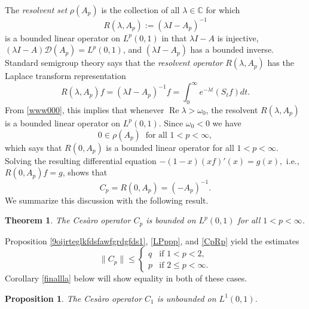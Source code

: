 \documentclass[11pt]{amsart}
\numberwithin{equation}{section}
\theoremstyle{plain}
\newtheorem{Proposition}[equation]{Proposition}
\newtheorem{Theorem}[equation]{Theorem}
\theoremstyle{definition}
\renewcommand{\leq}{\leqslant}
\renewcommand{\Re}[1]{\operatorname{Re} #1 }
\newcommand{\0}{{\color{lightgray}0}}
\begin{document}
 The {\em resolvent set} $\rho(A_p)$ is the collection of all $\lambda\in\mathbb{C}$ for which 
$$R(\lambda,A_p):=(\lambda I-A_p)^{-1}$$
is a bounded linear operator on $L^p(0, 1)$ in that $\lambda I - A$ is injective, $(\lambda I - A) \mathcal{D}(A_p) = L^p(0, 1)$, and $(\lambda I - A_p)$ has a bounded inverse. 
Standard semigroup theory  says that the {\em resolvent operator} $R(\lambda,A_p)$ has the Laplace transform  representation
\begin{equation}\label{LPppp}
R(\lambda,A_p)f =(\lambda I-A_p)^{-1}f =\int_{0}^{\infty}e^{-\lambda t}(S_{t}f)dt.
\end{equation}
From \eqref{www000}, this implies that whenever $\Re \lambda >\omega_{0}$, the resolvent $R(\lambda,A_p)$ is a bounded linear operator on $L^{p}(0,1)$. Since $\omega_{0}<0$ we have 
$$0\in\rho(A_p) \; \; \mbox{for all $1<p<\infty$},$$ which says that $R(0,A_p)$ is a bounded linear operator for all $1<p<\infty$.   Solving the resulting differential equation 
$-(1 - x) (x f)'(x) = g(x),$
i.e., $R(0, A_p) f = g$,  shows that 
\begin{equation}\label{CpRp}
C_p = R(0, A_p) = (-A_{p})^{-1}.
\end{equation} We summarize this discussion with the following result. 


\begin{Theorem}\label{BDLp}
The Ces\`{a}ro operator  $C_p$
is bounded on $L^{p}(0, 1)$ for all $1<p<\infty$.
\end{Theorem}

Proposition \ref{9oijrteglkfdsfawfgrdgfds1}, \eqref{LPppp}, and  \eqref{CpRp} yield the estimates 
\begin{equation}\label{upperCp}
\|C_p\| \leq 
\begin{cases}
q & \mbox{if $1 < p < 2$},\\
p & \mbox{if $2 \leq p < \infty$.}
\end{cases}
\end{equation}
Corollary \ref{finallla} below will show equality in both of these cases. 



\begin{Proposition}
The Ces\`{a}ro operator $C_1$  is unbounded on $L^1(0, 1)$.
\end{Proposition}
\end{document}

